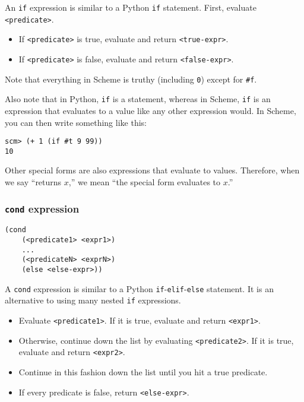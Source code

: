 An \lstinline{if} expression is similar to a Python \lstinline{if} statement. First, evaluate \lstinline{<predicate>}. 
\begin{itemize}
    \item If \lstinline{<predicate>} is true, evaluate and return \lstinline{<true-expr>}.
    \item If \lstinline{<predicate>} is false, evaluate and return \lstinline{<false-expr>}.
\end{itemize}
Note that everything in Scheme is truthy (including \lstinline{0}) except for \lstinline{#f}. 

Also note that in Python, \lstinline{if} is a statement, whereas in Scheme, \lstinline{if} is an expression that evaluates to a value like any other expression would. In Scheme, you can then write something like this:
\begin{lstlisting}
scm> (+ 1 (if #t 9 99))
10
\end{lstlisting}

Other special forms are also expressions that evaluate to values. 
Therefore, when we say ``returns $x$,'' we mean ``the special form evaluates to $x$.''

\subsubsection{\lstinline{cond} expression}

\begin{lstlisting}
(cond 
    (<predicate1> <expr1>) 
    ... 
    (<predicateN> <exprN>) 
    (else <else-expr>))
\end{lstlisting}

A \lstinline{cond} expression is similar to a Python \lstinline{if}-\lstinline{elif}-\lstinline{else} statement. It is an alternative to using many nested \lstinline{if} expressions. 

\begin{itemize}
    \item Evaluate \lstinline{<predicate1>}. If it is true, evaluate and return \lstinline{<expr1>}.
    \item Otherwise, continue down the list by evaluating \lstinline{<predicate2>}. If it is true, evaluate and return \lstinline{<expr2>}.
    \item Continue in this fashion down the list until you hit a true predicate.
    \item If every predicate is false, return \lstinline{<else-expr>}. 
\end{itemize}

